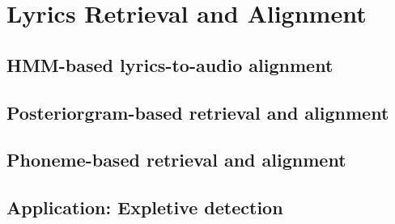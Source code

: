 \chapter{Lyrics Retrieval and Alignment} \label{chap:retrieval_alignment}
\section{HMM-based lyrics-to-audio alignment}

\section{Posteriorgram-based retrieval and alignment}

\section{Phoneme-based retrieval and alignment}

\section{Application: Expletive detection}
